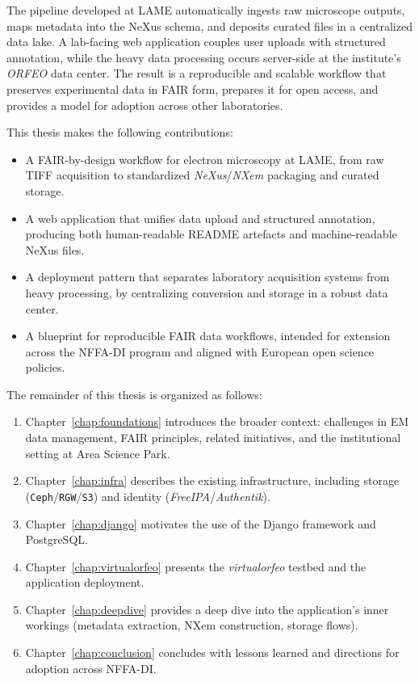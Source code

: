 The pipeline developed at LAME automatically ingests raw microscope outputs, maps metadata into the NeXus schema, and deposits curated files in a centralized data lake. 
A lab-facing web application couples user uploads with structured annotation, while the heavy data processing occurs server-side at the institute’s \textit{ORFEO} data center. 
The result is a reproducible and scalable workflow that preserves experimental data in FAIR form, prepares it for open access, and provides a model for adoption across other laboratories.

\medskip
\noindent This thesis makes the following contributions:
\begin{itemize}
	\item A FAIR-by-design workflow for electron microscopy at LAME, from raw TIFF acquisition to standardized \textit{NeXus}/\textit{NXem} packaging and curated storage.
	\item A web application that unifies data upload and structured annotation, producing both human-readable README artefacts and machine-readable NeXus files.
	\item A deployment pattern that separates laboratory acquisition systems from heavy processing, by centralizing conversion and storage in a robust data center.
	\item A blueprint for reproducible FAIR data workflows, intended for extension across the NFFA-DI program and aligned with European open science policies.
\end{itemize}

\medskip
\noindent The remainder of this thesis is organized as follows:
\begin{enumerate}
	\item Chapter~\ref{chap:foundations} introduces the broader context: challenges in EM data management, FAIR principles, related initiatives, and the institutional setting at Area Science Park. 
	\item Chapter~\ref{chap:infra} describes the existing infrastructure, including storage (\texttt{Ceph}/\texttt{RGW}/\texttt{S3}) and identity (\textit{FreeIPA}/\textit{Authentik}). 
	\item Chapter~\ref{chap:django} motivates the use of the Django framework and PostgreSQL. 
	\item Chapter~\ref{chap:virtualorfeo} presents the \textit{virtualorfeo} testbed and the application deployment. 
	\item Chapter~\ref{chap:deepdive} provides a deep dive into the application’s inner workings (metadata extraction, NXem construction, storage flows). 
	\item Chapter~\ref{chap:conclusion} concludes with lessons learned and directions for adoption across NFFA-DI. 
\end{enumerate}

